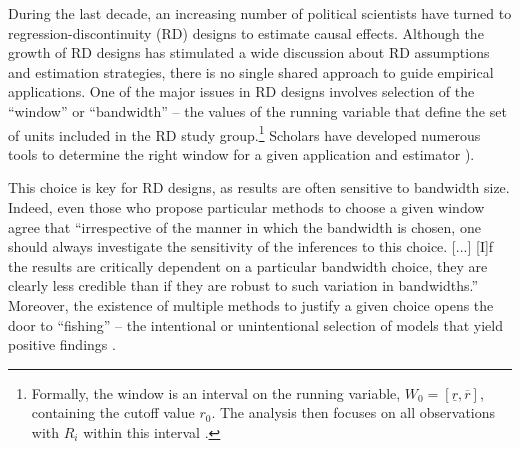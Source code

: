 \documentclass[letterpaper,twoside,12pt]{article}\usepackage[]{graphicx}\usepackage[]{color}
\begin{document}
\clearpage    

During the last decade, an increasing number of political scientists have turned to regression-discontinuity (RD) designs to estimate causal effects.  Although the growth of RD designs has stimulated a wide discussion about RD assumptions and estimation strategies, there is no single shared approach to guide empirical applications. One of the major issues in RD designs involves selection of the ``window'' or ``bandwidth'' -- the values of the running variable that define the set of units included in the RD study group.\footnote{Formally, the window is an interval on the running variable, $W_0=[\underline{r},\overline{r}]$, containing the cutoff value $r_0$. The analysis then focuses on all observations with $R_i$ within this interval \citep{cattaneo2015randomization}.} Scholars have developed numerous tools to determine the right window for a given application and  estimator \citep{imbens2008regression,imbens2011optimal,calonico2015robust}). 

This choice is key for RD designs, as results are often sensitive to bandwidth size. Indeed, even those who propose particular methods to choose a given window agree that ``irrespective of the manner in which the bandwidth is chosen, one should always investigate the sensitivity of the inferences to this choice. [...] [I]f the results are critically dependent on a particular bandwidth choice, they are clearly less credible than if they are robust to such variation in bandwidths.'' \citep[p.~633]{imbens2008regression} Moreover, the existence of multiple methods to justify a given choice opens the door to ``fishing'' -- the intentional or unintentional selection of models that yield positive findings \citep{Humphreys01012013}. 
\end{document}
